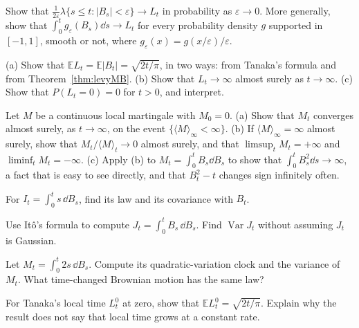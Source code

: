 \begin{exercise}[$\star\star$]\label{ex:occupation}
Show that $\frac1{2\varepsilon}\lambda\{s\le t:|B_s|<\varepsilon\}\to L_t$ in probability as $\varepsilon\to0$. More generally, show that $\int_0^tg_\varepsilon(B_s)\dd s\to L_t$ for every probability density $g$ supported in $[-1,1]$, smooth or
not, where $g_\varepsilon(x)=g(x/\varepsilon)/\varepsilon$.
\end{exercise}

\begin{exercise}[$\star$]\label{ex:locallaw}
(a) Show that $\mathbb EL_t=\mathbb E|B_t|=\sqrt{2t/\pi}$, in two ways: from Tanaka's formula and from Theorem~\ref{thm:levyMB}. (b) Show that $L_t\to\infty$ almost surely as $t\to\infty$. (c) Show that $P(L_t=0)=0$ for $t>0$,
and interpret.
\end{exercise}

\begin{exercise}[$\star\star\star$]\label{ex:martslln}
Let $M$ be a continuous local martingale with $M_0=0$. (a) Show that $M_t$ converges almost surely, as $t\to\infty$, on the event $\{\langle M\rangle_\infty<\infty\}$. (b) If $\langle M\rangle_\infty=\infty$ almost surely, show that
$M_t/\langle M\rangle_t\to0$ almost surely, and that $\limsup_t M_t=+\infty$ and $\liminf_tM_t=-\infty$. (c) Apply (b) to $M_t=\int_0^tB_s\dd B_s$ to show that $\int_0^tB_s^2\dd s\to\infty$, a fact that is easy to see
directly, and that $B_t^2-t$ changes sign infinitely often.
\end{exercise}

\begin{exercise}[$\star$]\label{ex:v12itoisometry}
For $I_t=\int_0^t s\,\dd B_s$, find its law and its covariance with $B_t$.
\end{exercise}

\begin{exercise}[$\star$]\label{ex:v12itosquare}
Use Itô's formula to compute $J_t=\int_0^t B_s\,\dd B_s$. Find $\operatorname{Var}J_t$ without assuming $J_t$ is Gaussian.
\end{exercise}

\begin{exercise}[$\star\star$]\label{ex:v12ddsclock}
Let $M_t=\int_0^t2s\,\dd B_s$. Compute its quadratic-variation clock and the variance of $M_t$. What time-changed Brownian motion has the same law?
\end{exercise}

\begin{exercise}[$\star\star\star$]\label{ex:v12localmean}
For Tanaka's local time $L_t^0$ at zero, show that $\mathbb EL_t^0=\sqrt{2t/\pi}$. Explain why the result does not say that local time grows at a constant rate.
\end{exercise}

